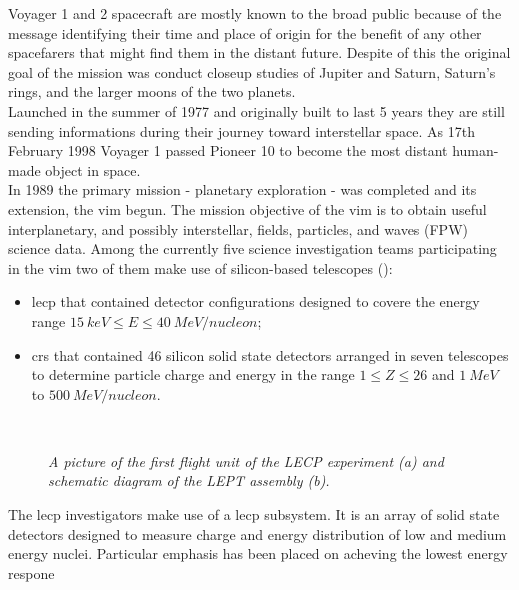 Voyager 1 and 2 spacecraft are mostly known to the broad public
because of the message identifying their time and place of origin for
the benefit of any other spacefarers that might find them in the
distant future. Despite of this the original goal of the mission was
conduct closeup studies of Jupiter and Saturn,
Saturn's rings, and the larger moons of the two planets.\\
Launched in the summer of 1977 and originally built to last 5 years
they are still sending informations during their journey toward
interstellar space. As 17th February 1998 Voyager 1 passed Pioneer 10
to become the most distant
human-made object in space.\\
In 1989 the primary mission - planetary exploration - was completed
and its extension, the \gls{vim} begun. The mission objective of the
\gls{vim} is to obtain useful interplanetary, and possibly
interstellar, fields, particles, and waves (FPW) science data. Among
the currently five science investigation teams participating in the
\gls{vim} two of them make use of silicon-based telescopes
():
\begin{itemize}
\item \gls{lecp} that contained detector configurations designed to
  covere the energy range $15~keV \le E \le 40~MeV/nucleon$;
\item \gls{crs} that contained 46 silicon solid state detectors
  arranged in seven telescopes to determine particle charge and energy
  in the range $1 \le Z \le 26$ and $1~MeV$ to $500~MeV/nucleon$.
\end{itemize}
\begin{figure}
  \centering {}
   \\
  \caption{\textit{A picture of the first flight unit of the LECP
      experiment (a) and schematic diagram of the LEPT assembly
      (b).~\cite{}}}\label{vojager}
\end{figure}
The \gls{lecp} investigators make use of a \gls{lecp} subsystem. It is
an array of solid state detectors designed to measure charge and
energy distribution of low and medium energy nuclei. Particular
emphasis has been placed on acheving the lowest energy respone
